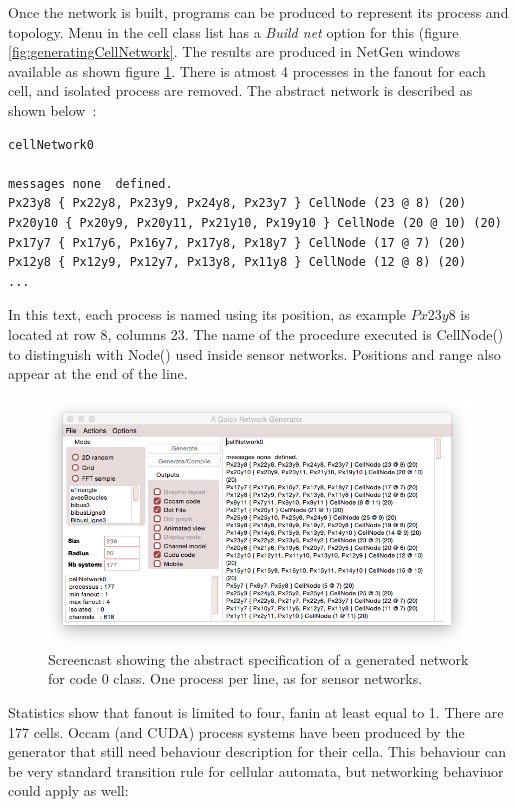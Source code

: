 Once the network is built, programs can be produced to represent its process and topology.
Menu in the cell class list has a {\sl Build net} option for this (figure \ref{fig:generatingCellNetwork}.
The results are produced in NetGen windows available as shown figure  \ref{fig:cellNetworkSample}.
There is atmost 4 processes in the fanout for each cell, and isolated process are removed.
The abstract network is described as shown below~:
\begin{lstlisting}
cellNetwork0

messages none  defined. 
Px23y8 { Px22y8, Px23y9, Px24y8, Px23y7 } CellNode (23 @ 8) (20)
Px20y10 { Px20y9, Px20y11, Px21y10, Px19y10 } CellNode (20 @ 10) (20)
Px17y7 { Px17y6, Px16y7, Px17y8, Px18y7 } CellNode (17 @ 7) (20)
Px12y8 { Px12y9, Px12y7, Px13y8, Px11y8 } CellNode (12 @ 8) (20)
...
\end{lstlisting}


In this text, each process is named using its position, as example $Px23y8$ is located at
row 8, columns 23. The name of the procedure executed is CellNode() to distinguish with Node()
used inside sensor networks. Positions and range also appear at the end of the line.


\begin{figure}[hbtp]
\begin{center} 
\includegraphics[width=12cm]{cellNetworkSample.png}
\caption{Screencast showing the abstract specification of a generated network for code 0 class.
One process per line, as for sensor networks.}
\label{fig:cellNetworkSample}
\end{center}
\end{figure}

Statistics show that fanout is limited to four, fanin at least equal to 1. There are 177 cells.
Occam (and CUDA) process systems have been produced by the generator that  still need
behaviour description for  their  cella. This behaviour can be very standard transition rule
for cellular automata, but networking behaviuor could apply as well:


